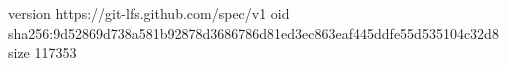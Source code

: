 version https://git-lfs.github.com/spec/v1
oid sha256:9d52869d738a581b92878d3686786d81ed3ec863eaf445ddfe55d535104c32d8
size 117353
